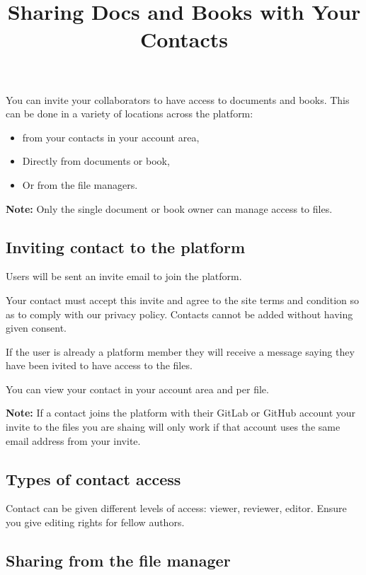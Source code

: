 \documentclass{article}
\begin{document}
\title{Sharing Docs and Books with Your Contacts}

\maketitle


You can invite your collaborators to have access to documents and books. This can be done in a variety of locations across the platform:

\begin{itemize}
\item from your contacts in your account area,


\item Directly from documents or book,


\item Or from the file managers.


\end{itemize}

\textbf{Note:} Only the single document or book owner can manage access to files.


\subsection{Inviting contact to the platform}\label{H4501110}



Users will be sent an invite email to join the platform. 


Your contact must accept this invite and agree to the site terms and condition so as to comply with our privacy policy. Contacts cannot be added without having given consent.


If the user is already a platform member they will receive a message saying they have been ivited to have access to the files.


You can view your contact in your account area and per file.


\textbf{Note:} If a contact joins the platform with their GitLab or GitHub account your invite to the files you are shaing will only work if that account uses the same email address from your invite.


\subsection{Types of contact access}\label{H3388152}



Contact can be given different levels of access: viewer, reviewer, editor. Ensure you give editing rights for fellow authors.


\subsection{Sharing from the file manager}\label{H2997562}
\end{document}
